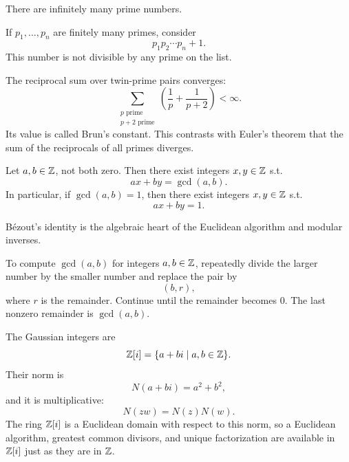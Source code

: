     \begin{theorem}
        There are infinitely many prime numbers.
    \end{theorem}

    \begin{idea}
        If $p_1,\dots,p_n$ are finitely many primes, consider
        \[
            p_1p_2\cdots p_n+1.
        \]
        This number is not divisible by any prime on the list.
    \end{idea}

    \begin{theorem}
        The reciprocal sum over twin-prime pairs converges:
        \[
            \sum_{\substack{p\text{ prime}\\p+2\text{ prime}}}
            \left(\frac{1}{p}+\frac{1}{p+2}\right)
            <\infty.
        \]
        Its value is called Brun's constant. This contrasts with Euler's
        theorem that the sum of the reciprocals of all primes diverges.
    \end{theorem}

    \begin{theorem}
        Let $a,b\in\mathbb{Z}$, not both zero. Then there exist integers $x,y\in\mathbb{Z}$
        s.t.
        \[
            ax+by=\gcd(a,b).
        \]
        In particular, if $\gcd(a,b)=1$, then there exist integers $x,y\in\mathbb{Z}$
        s.t.
        \[
            ax+by=1.
        \]
    \end{theorem}

    \begin{remark}
        B\'ezout's identity is the algebraic heart of the Euclidean algorithm and
        modular inverses.
    \end{remark}

    \begin{algorithm}
        To compute $\gcd(a,b)$ for integers $a,b\in\mathbb{Z}$, repeatedly divide the
        larger number by the smaller number and replace the pair by
        \[
            (b,r),
        \]
        where $r$ is the remainder. Continue until the remainder becomes $0$.
        The last nonzero remainder is $\gcd(a,b)$.
    \end{algorithm}

    \begin{definition}
        The Gaussian integers are
        \[
            \mathbb{Z}[i]
            =
            \{a+bi\mid a,b\in\mathbb{Z}\}.
        \]
        Their norm is
        \[
            N(a+bi)=a^2+b^2,
        \]
        and it is multiplicative:
        \[
            N(zw)=N(z)N(w).
        \]
        The ring $\mathbb{Z}[i]$ is a Euclidean domain with respect to this norm, so a
        Euclidean algorithm, greatest common divisors, and unique factorization
        are available in $\mathbb{Z}[i]$ just as they are in $\mathbb{Z}$.
    \end{definition}

